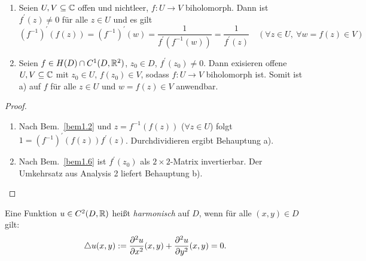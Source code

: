 \documentclass[a4paper,twoside,DIV15,BCOR12mm]{scrbook}
\begin{document}
\begin{satz} \label{satz1.8}
\begin{enumerate}
\item Seien $U, V \subseteq \mathbb{C}$ offen und nichtleer, $f\colon U \to V$ biholomorph. Dann ist $f^\prime(z)\neq 0$ für alle $z\in U$ und es gilt
\[(f^{-1})^\prime(f(z)) = (f^{-1})^\prime(w) = \frac{1}{f^\prime(f^{-1}(w))} = \frac{1}{f^\prime(z)} \quad (\forall z\in U,\ \forall w=f(z) \in V)\]
\item Seien $f\in H(D) \cap C^1(D, \mathbb{R}^2)$, $z_0\in D$, $f^\prime(z_0)\neq0$. Dann exisieren offene $U, V \subseteq \mathbb{C}$ mit $z_0\in U$, $f(z_0)\in V$, sodass $f\colon U \to V$ biholomorph ist. Somit ist a) auf $f$ für alle $z\in U$ und $w=f(z)\in V$ anwendbar.
\end{enumerate}
\end{satz}
\begin{proof}
\begin{enumerate}
\item Nach Bem.~\ref{bem1.2} und $z=f^{-1}(f(z))$ ($\forall z\in U$) folgt $1 = (f^{-1})^\prime(f(z))f^\prime(z)$. Durchdividieren ergibt Behauptung a).
\item Nach Bem.~\ref{bem1.6} ist $f^\prime(z_0)$ als $2\times2$-Matrix invertierbar. Der Umkehrsatz aus Analysis 2 liefert Behauptung b).\qedhere
\end{enumerate}
\end{proof}

\begin{dfn*} Eine Funktion $u\in C^2(D, \mathbb{R})$ heißt \emph{harmonisch} auf $D$, wenn für alle $(x, y) \in D$ gilt:
\[\triangle u(x, y) := \frac{\partial^2u}{\partial x^2}(x, y) + \frac{\partial^2u}{\partial y^2}(x, y) = 0.\]
\end{dfn*}
\end{document}
